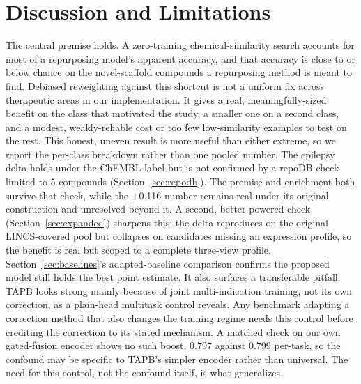 \documentclass{llncs}
\begin{document}
\section{Discussion and Limitations}
The central premise holds. A zero-training chemical-similarity search accounts for most of a repurposing model's apparent accuracy, and that accuracy is close to or below chance on the novel-scaffold compounds a repurposing method is meant to find. Debiased reweighting against this shortcut is not a uniform fix across therapeutic areas in our implementation. It gives a real, meaningfully-sized benefit on the class that motivated the study, a smaller one on a second class, and a modest, weakly-reliable cost or too few low-similarity examples to test on the rest. This honest, uneven result is more useful than either extreme, so we report the per-class breakdown rather than one pooled number. The epilepsy delta holds under the ChEMBL label but is not confirmed by a repoDB check limited to 5 compounds (Section~\ref{sec:repodb}). The premise and enrichment both survive that check, while the +0.116 number remains real under its original construction and unresolved beyond it. A second, better-powered check (Section~\ref{sec:expanded}) sharpens this: the delta reproduces on the original LINCS-covered pool but collapses on candidates missing an expression profile, so the benefit is real but scoped to a complete three-view profile. Section~\ref{sec:baselines}'s adapted-baseline comparison confirms the proposed model still holds the best point estimate. It also surfaces a transferable pitfall: TAPB looks strong mainly because of joint multi-indication training, not its own correction, as a plain-head multitask control reveals. Any benchmark adapting a correction method that also changes the training regime needs this control before crediting the correction to its stated mechanism. A matched check on our own gated-fusion encoder shows no such boost, 0.797 against 0.799 per-task, so the confound may be specific to TAPB's simpler encoder rather than universal. The need for this control, not the confound itself, is what generalizes.
\end{document}
